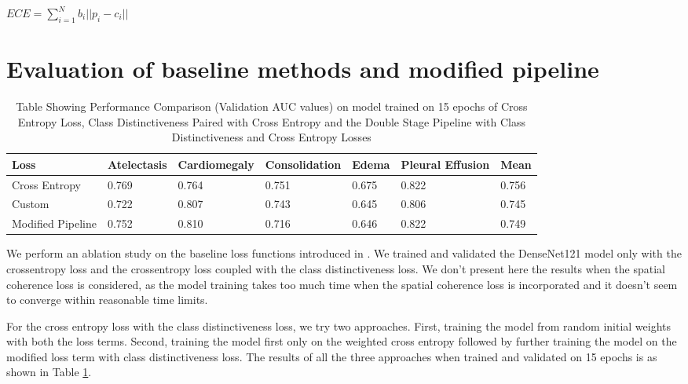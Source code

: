 \begin{center}
{ $ECE=\sum_{i=1}^Nb_i||p_i-c_i||$}
\end{center}


\section{Evaluation of baseline methods and modified pipeline}

\begin{table}[htbp]
\centering
\begin{tabular}{|p{1.5cm}|p{2.25cm}|p{2.25cm}|p{2.25cm}|p{1.5cm}|p{2.25cm}|p{1.25cm}|}
  \hline
  Loss & Atelectasis & Cardiomegaly & Consolidation & Edema & Pleural Effusion & Mean\\
  \hline
  Cross Entropy  &  0.769 &
0.764 &
0.751 &
0.675 &
0.822 &
0.756
\\
  \hline  
  Custom &  0.722 &
0.807 &
0.743 &
0.645 &
0.806 &
0.745

\\
  \hline
  Modified Pipeline &  0.752 &
0.810 &
0.716 &
0.646 &
0.822 &
0.749

\\
  \hline
\end{tabular}
\caption{\label{baseline_results}Table Showing Performance Comparison (Validation AUC values) on model trained on 15 epochs of Cross Entropy Loss, Class Distinctiveness Paired with Cross Entropy and the Double Stage Pipeline with Class Distinctiveness and Cross Entropy Losses}
\end{table}

We perform an ablation study on the baseline loss functions introduced in \cite{MAHAPATRA2022102551}. 
We trained and validated the DenseNet121 model only with the crossentropy loss and the crossentropy loss coupled with the class distinctiveness loss. We don't present here the results when the spatial coherence loss is considered, as the model training takes too much time when the spatial coherence loss is incorporated and it doesn't seem to converge within reasonable time limits. 

For the cross entropy loss with the class distinctiveness loss, we try two approaches. First, training the model from random initial weights with both the loss terms. Second, training the model first only on the weighted cross entropy followed by further training the model on the modified loss term with class distinctiveness loss. The results of all the three approaches when trained and validated on 15 epochs is as shown in Table \ref{baseline_results}.

